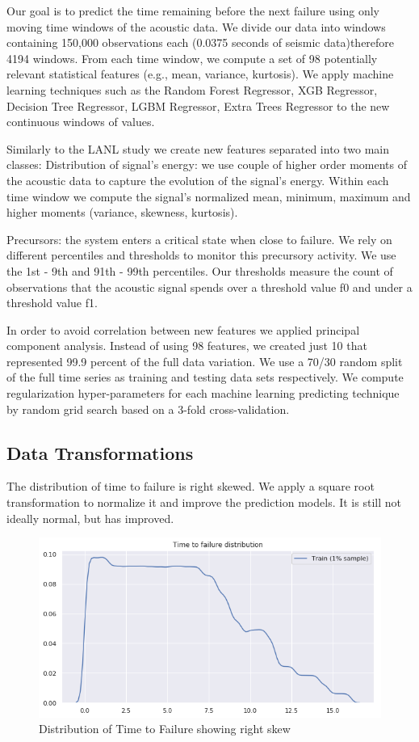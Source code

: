 \documentclass[]{llncs}
\begin{document}
Our goal is to predict the time remaining before the next failure using only moving time windows of the acoustic data. We divide our data into windows containing 150,000 observations each (0.0375 seconds of seismic data)therefore 4194 windows. From each time window, we compute a set of 98 potentially relevant statistical features (e.g., mean, variance, kurtosis). 
We apply machine learning techniques such as the Random Forest Regressor, XGB Regressor,  Decision Tree Regressor, LGBM Regressor, Extra Trees Regressor to the new continuous windows of values.\par
Similarly to the LANL study we create new features separated into two main classes: 
Distribution of signal’s energy: we use couple of higher order moments of the acoustic data to capture the evolution of the signal’s energy. Within each time window we compute the signal’s normalized mean, minimum, maximum and higher moments  (variance, skewness, kurtosis).\par
Precursors: the system enters a critical state when close to failure. We rely on different percentiles and thresholds to monitor this precursory activity. We use the 1st - 9th and 91th - 99th percentiles. Our thresholds measure the count of observations that the acoustic signal spends over a threshold value f0 and under a threshold value f1.

In order to avoid correlation between new features we applied principal component analysis.  Instead of using 98 features, we created just 10 that represented 99.9 percent of the full data variation.
We use a 70/30 random split of the full time series as training and testing data sets respectively. We compute regularization hyper-parameters for each machine learning predicting technique by random grid search based on a 3-fold cross-validation.
\subsection{Data Transformations}
The distribution of time to failure is right skewed. We apply a square root transformation to normalize it and improve the prediction models. It is still not ideally normal, but has improved.
\begin{figure}
	\centering
	\includegraphics[width=1\linewidth]{../GPUProject/transform1}
	\caption{Distribution of Time to Failure showing right skew}
	\label{fig:morethan90percent}
\end{figure}
\end{document}

